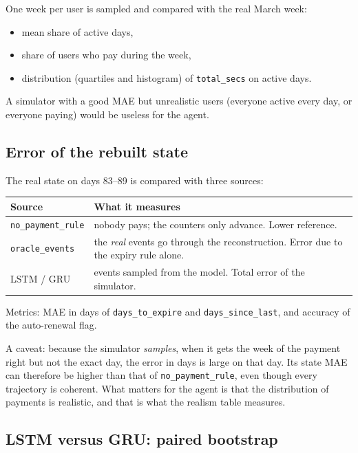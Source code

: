 \documentclass[11pt]{article}
\newcommand{\code}[1]{\texttt{#1}}
\begin{document}
One week per user is sampled and compared with the real March week:
\begin{itemize}
  \item mean share of active days,
  \item share of users who pay during the week,
  \item distribution (quartiles and histogram) of \code{total\_secs} on active days.
\end{itemize}
A simulator with a good MAE but unrealistic users (everyone active every day, or everyone paying) would be useless for the agent.

\subsection{Error of the rebuilt state}

The real state on days 83--89 is compared with three sources:
\begin{table}[H]
\centering
\renewcommand{\arraystretch}{1.2}
\begin{tabularx}{\textwidth}{lX}
\toprule
\textbf{Source} & \textbf{What it measures} \\
\midrule
\code{no\_payment\_rule} & nobody pays; the counters only advance. Lower reference. \\
\code{oracle\_events} & the \emph{real} events go through the reconstruction. Error due to the expiry rule alone. \\
LSTM / GRU & events sampled from the model. Total error of the simulator. \\
\bottomrule
\end{tabularx}
\end{table}
Metrics: MAE in days of \code{days\_to\_expire} and \code{days\_since\_last}, and accuracy of the auto-renewal flag.

A caveat: because the simulator \emph{samples}, when it gets the week of the payment right but not the exact day, the error in days is large on that day. Its state MAE can therefore be higher than that of \code{no\_payment\_rule}, even though every trajectory is coherent. What matters for the agent is that the distribution of payments is realistic, and that is what the realism table measures.

\subsection{LSTM versus GRU: paired bootstrap}
\end{document}
